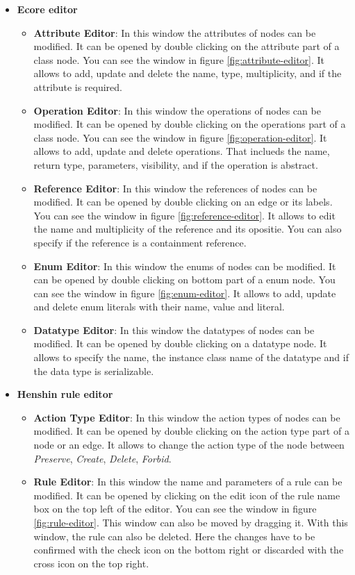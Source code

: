 \begin{itemize}
    \item \textbf{Ecore editor}
    \begin{itemize}
        \item \textbf{Attribute Editor}: In this window the attributes of nodes can be modified. It can be opened by double clicking on the attribute part of a class node. You can see the window in figure \ref{fig:attribute-editor}. It allows to add, update and delete the name, type, multiplicity, and if the attribute is required. 
        \item \textbf{Operation Editor}: In this window the operations of nodes can be modified. It can be opened by double clicking on the operations part of a class node. You can see the window in figure \ref{fig:operation-editor}. It allows to add, update and delete operations. That inclueds the name, return type, parameters, visibility, and if the operation is abstract.
        \item \textbf{Reference Editor}: In this window the references of nodes can be modified. It can be opened by double clicking on an edge or its labels. You can see the window in figure \ref{fig:reference-editor}. It allows to edit the name and multiplicity of the reference and its opositie. You can also specify if the reference is a containment reference.
        \item \textbf{Enum Editor}: In this window the enums of nodes can be modified. It can be opened by double clicking on bottom part of a enum node. You can see the window in figure \ref{fig:enum-editor}. It allows to add, update and delete enum literals with their name, value and literal.
        \item \textbf{Datatype Editor}: In this window the datatypes of nodes can be modified. It can be opened by double clicking on a datatype node. It allows to specify the name, the instance class name of the datatype and if the data type is serializable.
    \end{itemize}
    \item \textbf{Henshin rule editor}
    \begin{itemize}
        \item \textbf{Action Type Editor}: In this window the action types of nodes can be modified. It can be opened by double clicking on the action type part of a node or an edge. It allows to change the action type of the node between \textit{Preserve}, \textit{Create}, \textit{Delete}, \textit{Forbid}.
        \item \textbf{Rule Editor}: In this window the name and parameters of a rule can be modified. It can be opened by clicking on the edit icon of the rule name box on the top left of the editor. You can see the window in figure \ref{fig:rule-editor}. This window can also be moved by dragging it. With this window, the rule can also be deleted. Here the changes have to be confirmed with the check icon on the bottom right or discarded with the cross icon on the top right.

\end{itemize}
\end{itemize}
